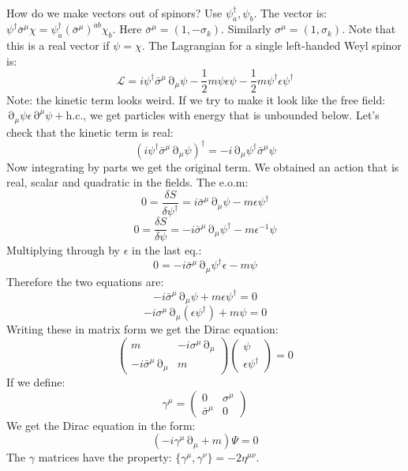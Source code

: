 \documentclass[12 pt]{article}
\DeclareMathOperator {\p} {\partial}
\begin{document}
\\
How do we make vectors out of spinors? Use $\psi^{\dagger}_{\dot a} , \psi_b$. The vector is: $\psi^{\dagger} \bar \sigma^{\mu} \chi = \psi^{\dagger}_{\dot a} (\bar \sigma^{\mu})^{\dot a b} \chi_b$. Here $\bar \sigma^{\mu} = (1 , - \sigma_k)$. Similarly $\sigma^{\mu} = (1 , \sigma_k)$. Note that this is a real vector if $\psi = \chi$. The Lagrangian for a single left-handed Weyl spinor is:
\[     \mathcal{L} = i \psi^{\dagger} \bar \sigma^{\mu} \p_{\mu} \psi - \frac{1}{2} m \psi \epsilon \psi - \frac{1}{2} m \psi^{\dagger} \epsilon \psi^{\dagger}    \]
Note: the kinetic term looks weird. If we try to make it look like the free field: $\p_{\mu} \psi \epsilon \p^{\mu} \psi + \text{h.c.}$, we get particles with energy that is unbounded below. Let's check that the kinetic term is real:
\[      (i \psi^{\dagger} \bar \sigma^{\mu} \p_{\mu} \psi)^{\dagger} = -i \p_{\mu} \psi^{\dagger} \bar \sigma^{\mu} \psi     \]
Now integrating by parts we get the original term. We obtained an action that is real, scalar and quadratic in the fields. The e.o.m:
\[   0 = \frac{\delta S}{\delta \psi^{\dagger}} = i \bar \sigma^{\mu} \p_{\mu} \psi - m \epsilon \psi^{\dagger}   \]
\[   0 = \frac{\delta S}{\delta \psi} = -i \bar \sigma^{\mu} \p_{\mu}\psi^{\dagger} - m\epsilon^{-1} \psi               \]
Multiplying through by $\epsilon$ in the last eq.:
\[      0 =    -i \bar \sigma^{\mu} \p_{\mu}\psi^{\dagger} \epsilon - m \psi    \]
Therefore the two equations are:
\[         - i \bar \sigma^{\mu} \p_{\mu} \psi + m \epsilon \psi^{\dagger} = 0  \]
\[         -i \sigma^{\mu} \p_{\mu} (\epsilon\psi^{\dagger}) + m \psi = 0                 \]
Writing these in matrix form we get the Dirac equation:
\[          \left(   \begin{array} {cc}  m & -i \sigma^{\mu} \p_{\mu} \\ - i \bar \sigma^{\mu} \p_{\mu} & m \end{array}  \right)   \left( \begin{array} {c} \psi \\ \epsilon \psi^{\dagger} \end{array} \right) = 0        \]
If we define:
\[   \gamma^{\mu} = \left( \begin{array} {cc} 0 & \sigma^{\mu} \\ \bar \sigma^{\mu} & 0 \end{array}   \right)   \]
We get the Dirac equation in the form:
\[    ( -i \gamma^{\mu} \p_{\mu} + m) \Psi = 0     \]
The $\gamma$ matrices have the property: $\{ \gamma^{\mu} , \gamma^{\nu} \} = -2\eta^{\mu \nu} $.
\end{document}
